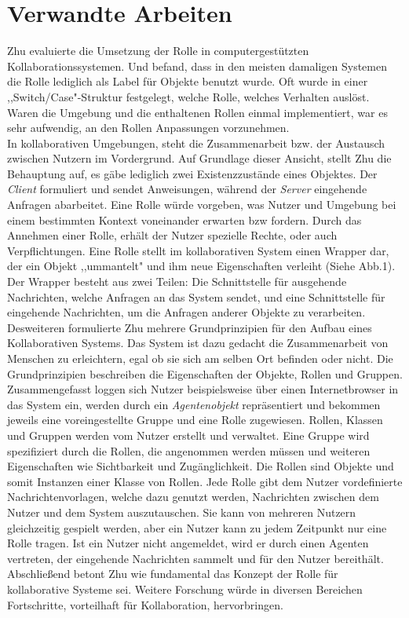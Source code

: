 \documentclass[conference]{IEEEtran}
\begin{document}
\section{Verwandte Arbeiten} Zhu evaluierte die Umsetzung der Rolle in computergestützten Kollaborationssystemen\cite{zhu2006role}. Und befand, dass in den meisten damaligen Systemen die Rolle lediglich als Label für Objekte benutzt wurde. Oft wurde in einer ,,Switch/Case"-Struktur festgelegt, welche Rolle, welches Verhalten auslöst. Waren die Umgebung und die enthaltenen Rollen einmal implementiert, war es sehr aufwendig, an den Rollen Anpassungen vorzunehmen.\\ In kollaborativen Umgebungen, steht die Zusammenarbeit bzw. der Austausch zwischen Nutzern im Vordergrund. Auf Grundlage dieser Ansicht, stellt Zhu die Behauptung auf, es gäbe lediglich zwei Existenzzustände eines Objektes. Der \textit{Client} formuliert und sendet Anweisungen, während der \textit{Server} eingehende Anfragen abarbeitet. Eine Rolle würde vorgeben, was Nutzer und Umgebung bei einem bestimmten Kontext voneinander erwarten bzw fordern. Durch das Annehmen einer Rolle, erhält der Nutzer spezielle Rechte, oder auch Verpflichtungen. Eine Rolle stellt im kollaborativen System einen Wrapper dar, der ein Objekt ,,ummantelt" und ihm neue Eigenschaften verleiht (Siehe Abb.1). Der Wrapper besteht aus zwei Teilen: Die Schnittstelle für ausgehende Nachrichten, welche Anfragen an das System sendet, und eine Schnittstelle für eingehende Nachrichten, um die Anfragen anderer Objekte zu verarbeiten. \\ Desweiteren formulierte Zhu mehrere Grundprinzipien für den Aufbau eines Kollaborativen Systems. Das System ist dazu gedacht die Zusammenarbeit von Menschen zu erleichtern, egal ob sie sich am selben Ort befinden oder nicht. Die Grundprinzipien beschreiben die Eigenschaften der Objekte, Rollen und Gruppen. Zusammengefasst loggen sich Nutzer beispielsweise über einen Internetbrowser in das System ein, werden durch ein \textit{Agentenobjekt} repräsentiert und bekommen jeweils eine voreingestellte Gruppe und eine Rolle zugewiesen. Rollen, Klassen und Gruppen werden vom Nutzer erstellt und verwaltet. Eine Gruppe wird spezifiziert durch die Rollen, die angenommen werden müssen und weiteren Eigenschaften wie Sichtbarkeit und Zugänglichkeit. Die Rollen sind Objekte und somit Instanzen einer Klasse von Rollen. Jede Rolle gibt dem Nutzer vordefinierte Nachrichtenvorlagen, welche dazu genutzt werden, Nachrichten zwischen dem Nutzer und dem System auszutauschen. Sie kann von mehreren Nutzern gleichzeitig gespielt werden, aber ein Nutzer kann zu jedem Zeitpunkt nur eine Rolle tragen. Ist ein Nutzer nicht angemeldet, wird er durch einen Agenten vertreten, der eingehende Nachrichten sammelt und für den Nutzer bereithält.\\ Abschließend betont Zhu wie fundamental das Konzept der Rolle für kollaborative Systeme sei. Weitere Forschung würde in diversen Bereichen Fortschritte, vorteilhaft für Kollaboration, hervorbringen.
\end{document}
